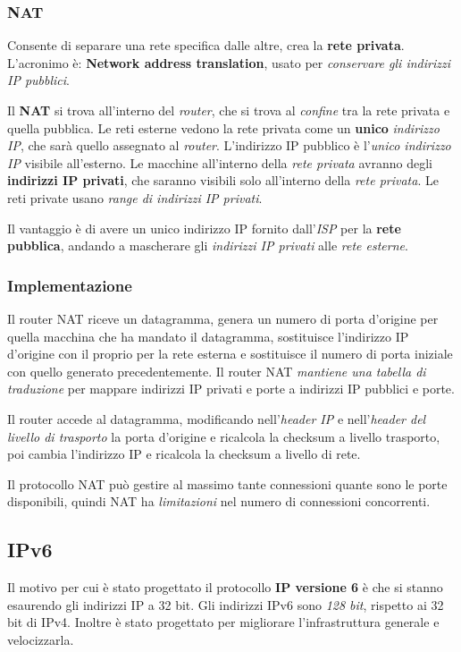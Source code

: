 \subsubsection{NAT}
Consente di separare una rete specifica dalle altre, crea la \textbf{rete privata}. L'acronimo è: \textbf{Network address translation}, usato per \textit{conservare gli indirizzi IP pubblici}.

Il \textbf{NAT} si trova all'interno del \textit{router}, che si trova al \textit{confine} tra la rete privata e quella pubblica. Le reti esterne vedono la rete privata come un \textbf{unico} \textit{indirizzo IP}, che sarà quello assegnato al \textit{router}. L'indirizzo IP pubblico è l'\textit{unico indirizzo IP} visibile all'esterno. Le macchine all'interno della \textit{rete privata} avranno degli \textbf{indirizzi IP privati}, che saranno visibili solo all'interno della \textit{rete privata}. Le reti private usano \textit{range di indirizzi IP privati}.

Il vantaggio è di avere un unico indirizzo IP fornito dall'\textit{ISP} per la \textbf{rete pubblica}, andando a mascherare gli \textit{indirizzi IP privati} alle \textit{rete esterne}.

\subsubsection*{Implementazione}
Il router NAT riceve un datagramma, genera un numero di porta d'origine per quella macchina che ha mandato il datagramma, sostituisce l'indirizzo IP d'origine con il proprio per la rete esterna e sostituisce il numero di porta iniziale con quello generato precedentemente. Il router NAT \textit{mantiene una tabella di traduzione} per mappare indirizzi IP privati e porte a indirizzi IP pubblici e porte.

Il router accede al datagramma, modificando nell'\textit{header IP} e nell'\textit{header del livello di trasporto} la porta d'origine e ricalcola la checksum a livello trasporto, poi cambia l'indirizzo IP e ricalcola la checksum a livello di rete.

Il protocollo NAT può gestire al massimo tante connessioni quante sono le porte disponibili, quindi NAT ha \textit{limitazioni} nel numero di connessioni concorrenti.

\subsection{IPv6}
Il motivo per cui è stato progettato il protocollo \textbf{IP versione 6} è che si stanno esaurendo gli indirizzi IP a 32 bit. Gli indirizzi IPv6 sono \textit{128 bit}, rispetto ai 32 bit di IPv4. Inoltre è stato progettato per migliorare l'infrastruttura generale e velocizzarla.

